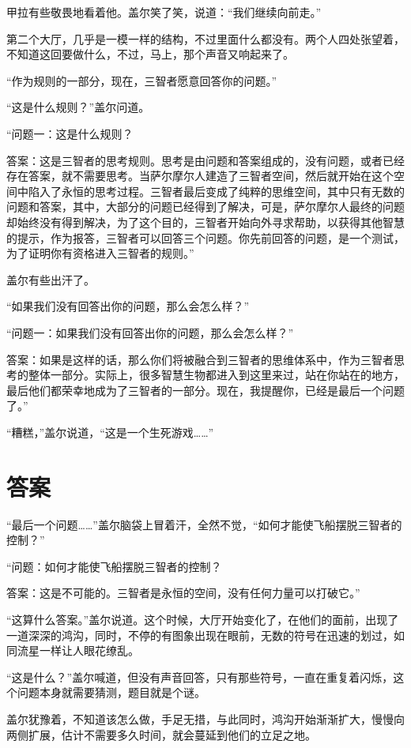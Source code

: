 甲拉有些敬畏地看着他。盖尔笑了笑，说道：“我们继续向前走。” 

第二个大厅，几乎是一模一样的结构，不过里面什么都没有。两个人四处张望着，不知道这回要做什么，不过，马上，那个声音又响起来了。 

“作为规则的一部分，现在，三智者愿意回答你的问题。” 

“这是什么规则？”盖尔问道。 

“问题一：这是什么规则？ 

答案：这是三智者的思考规则。思考是由问题和答案组成的，没有问题，或者已经存在答案，就不需要思考。当萨尔摩尔人建造了三智者空间，然后就开始在这个空间中陷入了永恒的思考过程。三智者最后变成了纯粹的思维空间，其中只有无数的问题和答案，其中，大部分的问题已经得到了解决，可是，萨尔摩尔人最终的问题却始终没有得到解决，为了这个目的，三智者开始向外寻求帮助，以获得其他智慧的提示，作为报答，三智者可以回答三个问题。你先前回答的问题，是一个测试， 为了证明你有资格进入三智者的规则。” 

盖尔有些出汗了。 

“如果我们没有回答出你的问题，那么会怎么样？” 

“问题一：如果我们没有回答出你的问题，那么会怎么样？” 

答案：如果是这样的话，那么你们将被融合到三智者的思维体系中，作为三智者思考的整体一部分。实际上，很多智慧生物都进入到这里来过，站在你站在的地方，最后他们都荣幸地成为了三智者的一部分。现在，我提醒你，已经是最后一个问题了。” 

“糟糕，”盖尔说道，“这是一个生死游戏……” 

\chapter{答案}

“最后一个问题……”盖尔脑袋上冒着汗，全然不觉，“如何才能使飞船摆脱三智者的控制？” 

“问题：如何才能使飞船摆脱三智者的控制？ 

答案：这是不可能的。三智者是永恒的空间，没有任何力量可以打破它。” 

“这算什么答案。”盖尔说道。这个时候，大厅开始变化了，在他们的面前，出现了一道深深的鸿沟，同时，不停的有图象出现在眼前，无数的符号在迅速的划过，如同流星一样让人眼花缭乱。 

“这是什么？”盖尔喊道，但没有声音回答，只有那些符号，一直在重复着闪烁，这个问题本身就需要猜测，题目就是个谜。 

盖尔犹豫着，不知道该怎么做，手足无措，与此同时，鸿沟开始渐渐扩大，慢慢向两侧扩展，估计不需要多久时间，就会蔓延到他们的立足之地。 

